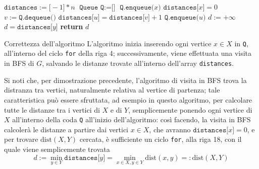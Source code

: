 \documentclass[a4paper, 12pt]{report}
\begin{document}
    \begin{algorithm}[H]
        \caption{
            Dato un grafo $G$, rappresentato attraverso liste di adiacenza, e due suoi sottoinsiemi di vertici $X, Y \subseteq V(G)$, l'algoritmo restituisce $\mathrm{dist}(X, Y)$.\\
            \textbf{Input}: $G$ grafo, rappresentato attraverso liste di adiacenza; $X, Y \subseteq V(G)$ sottoinsiemi di vertici di $G$.\\
            \textbf{Output}: $\mathrm{dist}(X, Y)$.
        }

        \begin{algorithmic}[1]
                \State $\texttt{distances}:=\texttt{[}-1\texttt{]} * n$
                \State $\texttt{Queue Q} := \texttt{[}\texttt{]}$
                    \State $\texttt{Q.enqueue(}x\texttt{)}$
                    \State $\texttt{distances[}x\texttt{]} = 0$ 
                \EndFor
                    \State $v := \texttt{Q.dequeue()}$
                         
                            \State $\texttt{distances[}u\texttt{]}=\texttt{distances[}v\texttt{]} + 1$
                            \State $\texttt{Q.enqueue(}u\texttt{)}$
                        \EndIf
                    \EndFor
                \EndWhile
                \State $d := + \infty$
                        \State $d = \texttt{distances[}y\texttt{]}$
                    \EndIf
                \EndFor
                \State \textbf{return} $d$
            \EndFunction
        \end{algorithmic}
    \end{algorithm}

    \begin{framedobs}{Correttezza dell'algoritmo}
        L'algoritmo inizia inserendo ogni vertice $x \in X$ in \texttt{Q}, all'interno del ciclo \texttt{for} della riga 4; successivamente, viene effettuata una visita in BFS di $G$, salvando le distanze trovate all'interno dell'array \texttt{distances}.

        Si noti che, per dimostrazione precedente, l'algoritmo di visita in BFS trova la distranza tra vertici, naturalmente relativa al vertice di partenza; tale caratteristica può essere sfruttata, ad esempio in questo algoritmo, per calcolare tutte le distanze tra i vertici di $X$ e di $Y$, semplicemente ponendo ogni vertice di $X$ all'interno della coda \texttt{Q} all'inizio dell'algoritmo: così facendo, la visita in BFS calcolerà le distanze a partire dai vertici $x \in X$, che avranno $\texttt{distances[}x\texttt{]} = 0$, e per trovare $\mathrm{dist}(X, Y)$ cercata, è sufficiente un ciclo \texttt{for}, alla riga 18, con il quale viene semplicemente trovata $$\displaystyle d := \min_{y \in Y}{\texttt{distances[}y\texttt{]}} = \min_{x \in X, y \in Y}{\mathrm{dist}(x, y)} =: \mathrm{dist}(X, Y)$$
    \end{framedobs}
\end{document}
